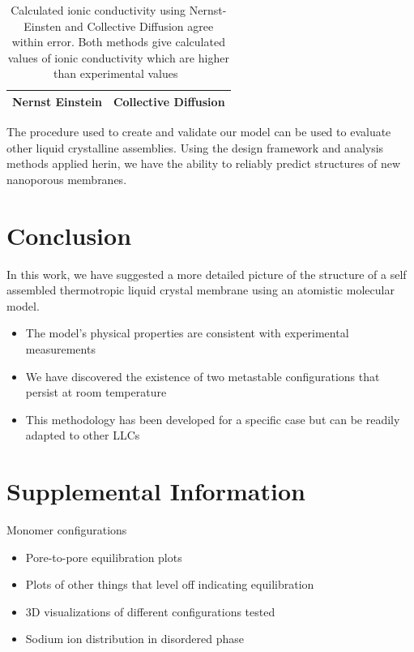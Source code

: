 \documentclass{article}
\begin{document}
	\begin{table}
	\centering
	\begin{tabular}{|c|c|}
	\hline
	Nernst Einstein & Collective Diffusion \\
	\hline
	\end{tabular}
	\caption{Calculated ionic conductivity using Nernst-Einsten and Collective Diffusion agree within error. Both methods give calculated values of ionic conductivity which are higher than experimental values~\label{table:conductivity}}
	\end{table}

	The procedure used to create and validate our model can be used to evaluate other liquid crystalline assemblies. Using the design framework and analysis methods applied herin, we have the ability to reliably predict structures of new nanoporous membranes.

	\section{Conclusion}
	
	In this work, we have suggested a more detailed picture of the structure of a self assembled thermotropic liquid crystal membrane using an atomistic molecular model.
	\begin{itemize}
		\item The model's physical properties are consistent with experimental measurements
		\item We have discovered the existence of two metastable configurations that persist at room temperature
		\item This methodology has been developed for a specific case but can be readily adapted to other LLCs
	\end{itemize}

	\section{Supplemental Information}
	
	Monomer configurations
	\begin{itemize}
		\item Pore-to-pore equilibration plots
		\item Plots of other things that level off indicating equilibration
		\item 3D visualizations of different configurations tested
		\item Sodium ion distribution in disordered phase
	\end{itemize}
	
\end{document}
